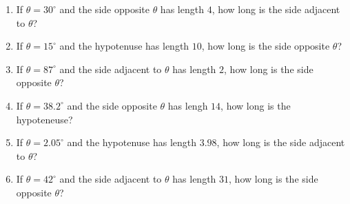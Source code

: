 \begin{enumerate}

\setcounter{enumi}{\value{HW}}

\item  If $\theta = 30^{\circ}$ and the side opposite $\theta$ has length $4$, how long is the side adjacent to $\theta$? \label{moretrianglecircfirst}

\item  If $\theta = 15^{\circ}$ and the hypotenuse has length $10$, how long is the side opposite $\theta$?

\item  If $\theta = 87^{\circ}$ and the side adjacent to $\theta$ has length $2$, how long is the side opposite $\theta$?

\item  If $\theta = 38.2^{\circ}$ and the side opposite $\theta$ has lengh $14$, how long is the hypoteneuse?

\item  If $\theta = 2.05^{\circ}$ and the hypotenuse has length $3.98$, how long is the side adjacent to $\theta$?

\item  If $\theta = 42^{\circ}$ and the side adjacent to $\theta$ has length $31$, how long is the side opposite $\theta$? \label{moretrianglecirclast}

\setcounter{HW}{\value{enumi}}

\end{enumerate}

